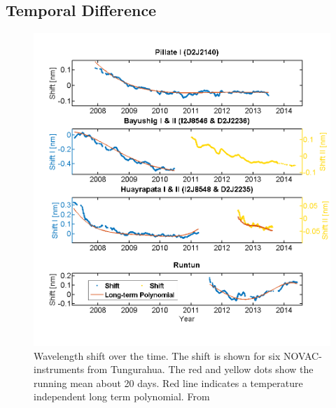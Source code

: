 \documentclass  [
  paper    = a4,
  BCOR     = 10mm,
  twoside,
  fontsize = 12pt,
  fleqn,
  toc      = bibnumbered,
  toc      = listofnumbered,
  numbers  = noendperiod,
  headings = normal,
  listof   = leveldown,
  version  = 3.03
]                                       {scrreprt}
\begin{document}
	\subsection{Temporal Difference}
	\begin{figure}
		\centering
		\includegraphics[width=1\linewidth]{Bilder/Simon/Bilder_Tung/Drift_Komplett_NEW}
		\caption{Wavelength shift over the time. The shift is shown for six NOVAC- instruments from Tungurahua. The red and yellow dots show the running mean about 20 days. Red line indicates a temperature independent long term polynomial. From \cite{WarnachSimon}}
		\label{fig:driftkomplettnew}
	\end{figure}
\end{document}
